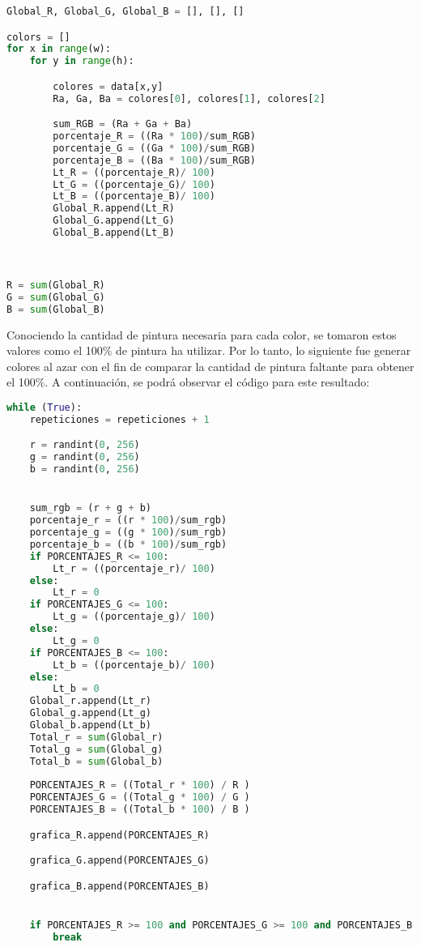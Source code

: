 \documentclass{article}
\begin{document}
\begin{lstlisting}[language=Python]
Global_R, Global_G, Global_B = [], [], []

colors = []
for x in range(w):
    for y in range(h):

        colores = data[x,y]
        Ra, Ga, Ba = colores[0], colores[1], colores[2]

        sum_RGB = (Ra + Ga + Ba)
        porcentaje_R = ((Ra * 100)/sum_RGB)
        porcentaje_G = ((Ga * 100)/sum_RGB)
        porcentaje_B = ((Ba * 100)/sum_RGB)
        Lt_R = ((porcentaje_R)/ 100)
        Lt_G = ((porcentaje_G)/ 100)
        Lt_B = ((porcentaje_B)/ 100)
        Global_R.append(Lt_R)
        Global_G.append(Lt_G)
        Global_B.append(Lt_B)



R = sum(Global_R)
G = sum(Global_G)
B = sum(Global_B)
 \end{lstlisting}
 
 Conociendo la cantidad de pintura necesaria para cada  color, se tomaron estos valores como el 100$\%$ de pintura ha utilizar. Por lo tanto, lo siguiente fue generar colores al azar con el fin de comparar la cantidad de pintura faltante para obtener el 100$\%$. A continuación, se podrá observar el código para este resultado:
 
 \begin{lstlisting}[language=Python]
 while (True):
    repeticiones = repeticiones + 1

    r = randint(0, 256)
    g = randint(0, 256)
    b = randint(0, 256)


    sum_rgb = (r + g + b)
    porcentaje_r = ((r * 100)/sum_rgb)
    porcentaje_g = ((g * 100)/sum_rgb)
    porcentaje_b = ((b * 100)/sum_rgb)
    if PORCENTAJES_R <= 100:
        Lt_r = ((porcentaje_r)/ 100)
    else:
        Lt_r = 0
    if PORCENTAJES_G <= 100:
        Lt_g = ((porcentaje_g)/ 100)
    else:
        Lt_g = 0
    if PORCENTAJES_B <= 100:
        Lt_b = ((porcentaje_b)/ 100)
    else:
        Lt_b = 0
    Global_r.append(Lt_r)
    Global_g.append(Lt_g)
    Global_b.append(Lt_b)
    Total_r = sum(Global_r)
    Total_g = sum(Global_g)
    Total_b = sum(Global_b)
    
    PORCENTAJES_R = ((Total_r * 100) / R )
    PORCENTAJES_G = ((Total_g * 100) / G )
    PORCENTAJES_B = ((Total_b * 100) / B )

    grafica_R.append(PORCENTAJES_R)

    grafica_G.append(PORCENTAJES_G)

    grafica_B.append(PORCENTAJES_B)


    if PORCENTAJES_R >= 100 and PORCENTAJES_G >= 100 and PORCENTAJES_B >= 100:
        break
  \end{lstlisting}
 
\end{document}
